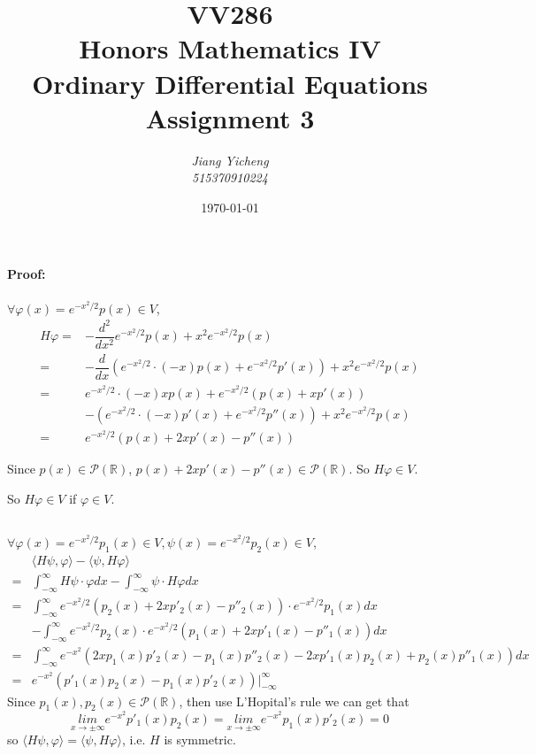 \documentclass[a4paper,12pt,titlepage]{article}
\author{\textit{Jiang Yicheng}\\\textit{515370910224}}
\title{\textbf{VV286\\ Honors Mathematics IV\\
Ordinary Differential Equations\\
		Assignment 3}}
\date{\today}
\begin{document}
\maketitle

\section{}
\subsection{}
\paragraph{Proof:}$\forall \varphi(x)=e^{-x^2/2}p(x)\in V$,
\begin{align*}
H\varphi=&-\dfrac{d^2}{dx^2}e^{-x^2/2}p(x)+x^2e^{-x^2/2}p(x)\\
=&-\dfrac{d}{dx}(e^{-x^2/2}\cdot(-x)p(x)+e^{-x^2/2}p'(x))+x^2e^{-x^2/2}p(x)\\
=&e^{-x^2/2}\cdot(-x)xp(x)+e^{-x^2/2}(p(x)+xp'(x))\\
&-(e^{-x^2/2}\cdot(-x)p'(x)+e^{-x^2/2}p''(x))+x^2e^{-x^2/2}p(x)\\
=&e^{-x^2/2}(p(x)+2xp'(x)-p''(x))
\end{align*}

Since $p(x)\in\mathcal{P}(\mathbb{R})$, $p(x)+2xp'(x)-p''(x)\in\mathcal{P}(\mathbb{R})$. So $H\varphi\in V$.

So $H\varphi\in V$ if $\varphi\in V$.
\subsection{}
$\forall \varphi(x)=e^{-x^2/2}p_1(x)\in V,\psi(x)=e^{-x^2/2}p_2(x)\in V$,
\begin{align*}
&\langle H\psi,\varphi\rangle-\langle \psi,H\varphi\rangle\\
=&\int_{-\infty}^{\infty}H\psi\cdot\varphi dx-\int_{-\infty}^{\infty}\psi\cdot H\varphi dx\\
=&\int_{-\infty}^{\infty}e^{-x^2/2}(p_2(x)+2xp'_2(x)-p''_2(x))\cdot e^{-x^2/2}p_1(x)dx\\
&-\int_{-\infty}^{\infty}e^{-x^2/2}p_2(x)\cdot e^{-x^2/2}(p_1(x)+2xp'_1(x)-p''_1(x))  dx\\
=&\int_{-\infty}^{\infty}e^{-x^2}(2xp_1(x)p'_2(x)-p_1(x)p''_2(x)-2xp'_1(x)p_2(x)+p_2(x)p''_1(x))dx\\
=&e^{-x^2}(p'_1(x)p_2(x)-p_1(x)p'_2(x))\Big|_{-\infty}^{\infty}
\end{align*}
Since $p_1(x),p_2(x)\in\mathcal{P}(\mathbb{R})$, then use L'Hopital's rule we can get that $$\underset{x\rightarrow \pm\infty}{lim}e^{-x^2}p'_1(x)p_2(x)=\underset{x\rightarrow \pm\infty}{lim}e^{-x^2}p_1(x)p'_2(x)=0$$
so $\langle H\psi,\varphi\rangle=\langle \psi,H\varphi\rangle$, i.e. $H$ is symmetric.
\end{document}
